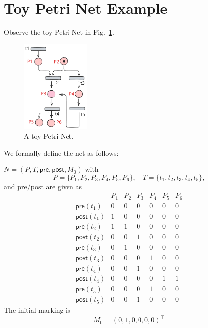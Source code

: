 

\section{Toy Petri Net Example}
\label{appendix:toyPN}

Observe the toy Petri Net in Fig.~\ref{fig:toyPN}.

\begin{figure}[H]
	\centering
	\includegraphics[width=0.3\textwidth]{plots/toy_PN_example.pdf}
	\caption{A toy Petri Net.}
	\label{fig:toyPN}
\end{figure}



We formally define the net as follows:

 \(N=(P,T,\mathsf{pre},\mathsf{post},M_0)\) with
\[
P=\{P_1,P_2,P_3,P_4,P_5,P_6\},\quad
T=\{t_1,t_2,t_3,t_4,t_5\},
\]
and pre/post are given as
\[
\begin{array}{c|cccccc}
	& P_1 & P_2 & P_3 & P_4 & P_5 & P_6 \\ \hline
	\mathsf{pre}(t_1)  & 0 & 0 & 0 & 0 & 0 & 0 \\
	\mathsf{post}(t_1) & 1 & 0 & 0 & 0 & 0 & 0 \\ \hline
	\mathsf{pre}(t_2)  & 1 & 1 & 0 & 0 & 0 & 0 \\
	\mathsf{post}(t_2) & 0 & 0 & 1 & 0 & 0 & 0 \\ \hline
	\mathsf{pre}(t_3)  & 0 & 1 & 0 & 0 & 0 & 0 \\
	\mathsf{post}(t_3) & 0 & 0 & 0 & 1 & 0 & 0 \\ \hline
	\mathsf{pre}(t_4)  & 0 & 0 & 1 & 0 & 0 & 0 \\
	\mathsf{post}(t_4) & 0 & 0 & 0 & 0 & 1 & 1 \\ \hline
	\mathsf{pre}(t_5)  & 0 & 0 & 0 & 1 & 0 & 0 \\
	\mathsf{post}(t_5) & 0 & 0 & 1 & 0 & 0 & 0
\end{array}
\]
The initial marking is
\[
M_0 = (0,1,0,0,0,0)^\top 
\]

